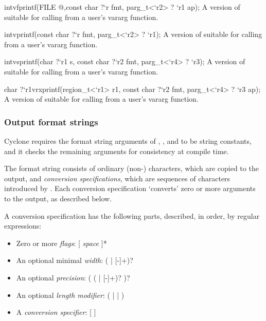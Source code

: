 \begin{defun2}{int}{vfprintf}{(FILE @,const char {?}`r fmt, parg_t<`r2> ? `r1 ap);}
  A version of  suitable for calling from a user's
  vararg function.
\end{defun2}
\begin{defun2}{int}{vprintf}{(const char {?}`r fmt, parg_t<`r2> ? `r1);}
  A version of  suitable for calling from a user's
  vararg function.
\end{defun2}
\begin{defun2}{int}{vsprintf}{(char {?}`r1 s, const char {?}`r2 fmt, parg_t<`r4> ? `r3);}
  A version of  suitable for calling from a user's
  vararg function.
\end{defun2}
\begin{defun2}{char {?}`r1}{vrxprintf}{(region_t<`r1> r1, const char {?}`r2 fmt, parg_t<`r4> ? `r3 ap);}
  A version of  suitable for calling from a user's
  vararg function.
\end{defun2}

\subsubsection*{Output format strings}

Cyclone requires the format string arguments of ,
, and  to be string constants, and it checks
the remaining arguments for consistency at compile time.

The format string consists of ordinary (non-\code{\%}) characters, which
are copied to the output, and \emph{conversion specifications}, which
are sequences of characters introduced by \code{\%}.  Each conversion
specification `converts' zero or more arguments to the output, as
described below.

A conversion specification has the following parts, described, in order,
by regular expressions:
\begin{itemize}
\item Zero or more \emph{flags}:
[\code{-} \code{+} \emph{space} \code{\#} ]*
\item An optional minimal \emph{width}:
(\code{*} | [-]+)?
\item An optional \emph{precision}:
( (\code{*} | [-]+)? )?
\item An optional \emph{length modifier}:
( |  |  )
\item A \emph{conversion specifier}:
[                 \code{\%}]
\end{itemize}

